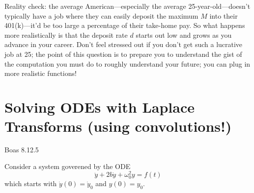 \documentclass[answers]{exam}\newcommand{\repositoryInformationSetup}{     \usepackage[dvipsnames]{xcolor}     \usepackage[ angle=90, color=black, opacity=1, scale=2, ]{background}      \SetBgPosition{current page.west}      \SetBgVshift{-4.5mm}      \backgroundsetup{contents={{\color{green}\texttt{-{}-} differs from commit \texttt{40a9b87} in 0 files}}} } \newcommand{\commit}{{{\color{green}40a9b87}}}\usepackage{amsmath}
\newcommand{\laplace}[1]{\ensuremath{\mathcal{L}\left\{#1\right\}}\xspace}
\begin{document}
\begin{questions}
	Reality check: the average American---especially the average 25-year-old---doesn't typically have a job where they can easily deposit the maximum $M$ into their 401(k)---it'd be too large a percentage of their take-home pay.
	So what happens more realistically is that the deposit rate $d$ starts out low and grows as you advance in your career.
	Don't feel stressed out if you don't get such a lucrative job at 25; the point of this question is to prepare you to understand the gist of the computation you must do to roughly understand your future; you can plug in more realistic functions!



	\section*{Solving ODEs with Laplace Transforms (using convolutions!)}
	\question Boas 8.12.5

	\begin{solution}\end{solution}
	\question Consider a system goverened by the ODE
	\begin{equation}
		\ddot{y} + 2b \dot{y} + \omega_0^2 y = f(t)
	\end{equation}
	which starts with $\dot{y}(0)=\dot{y}_0$ and $y(0)=y_0$.

\end{questions}
\end{document}
